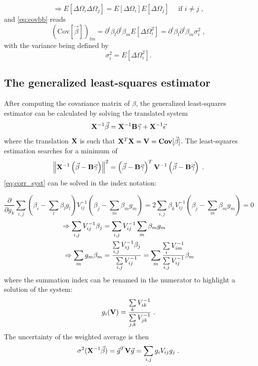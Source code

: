 %
%
\begin{equation}
\Rightarrow E\left[\Delta\Omega_i\Delta\Omega_j\right] = E\left[\Delta\Omega_i\right]E\left[\Delta\Omega_j\right]\quad \text{ if } i \neq j\;,
\end{equation}
%
and \eqref{eq:covbb} reads
%
\begin{equation}
(\text{Cov}[\vec{\beta}])_{lm} = \partial^i\beta_l\partial^i\beta_mE[\Delta\Omega_i^2] = \partial^i\beta_l\partial^i\beta_m \sigma_i^2\;,
\end{equation}
%
with the variance being defined by
%
\begin{equation}
\sigma_i^2 = E\left[\Delta\Omega_i^2\right].
\end{equation}
%
\subsection{The generalized least-squares estimator}

After computing the covariance matrix of $ \beta $, the generalized least-squares estimator can be calculated
by solving the translated system
%
\begin{equation}
\mathbf{X}^{-1} \vec{\beta} = \mathbf{X}^{-1}\mathbf{B}\vec{\gamma} + \mathbf{X}^{-1}\vec{\epsilon}
\end{equation}
%
where the translation $ \mathbf{X} $ is such that $ \mathbf{X}^T\mathbf{X} = \mathbf{V} = \mathbf{Cov}[\vec{\beta}] $. The least-squares estimation searches for a minimum of 
%
\begin{equation}
\left\|\mathbf{X}^{-1}\left(\vec{\beta} - \mathbf{B}\vec{\gamma}\right)\right\|^2 = \left(\vec{\beta} - \mathbf{B}\vec{\gamma}\right)^T \mathbf{V}^{-1}\left(\vec{\beta} - \mathbf{B}\vec{\gamma}\right)\;.
\label{eq:corr_syst}
\end{equation}
%
\eqref{eq:corr_syst} can be solved in the index notation:

\[\frac{\partial}{\partial g_k}\sum\limits_{i,j} \left(\beta_i - \sum_l\beta_lg_l\right) V_{ij}^{-1} \left(\beta_j-\sum_m\beta_mg_m\right) = 2\sum_{i,j}\beta_kV_{ij}^{-1}\left(\beta_j - \sum_m\beta_mg_m\right) = 0\]
%
\begin{align}
\Rightarrow \sum_{i,j}V_{ij}^{-1}\beta_j&=\sum_{i,j}V_{ij}^{-1}\sum_m\beta_mg_m\notag \\
\Rightarrow\sum_mg_m\beta_m &= \frac{\sum\limits_{i,j}V_{ij}^{-1}\beta_j}{\sum\limits_{i,j}V_{ij}^{-1}}=\sum_m \frac{\sum\limits_i V_{im}^{-1}}{\sum\limits_{i,j}V_{ij}^{-1}}\beta_m
\end{align}
%
 where the summation index can be renamed in the numerator to highlight a solution of the system:
%
\begin{equation}
g_i(\mathbf{V}) = \frac{\sum\limits_k V_{ik}^{-1}}{\sum\limits_{j,k}V_{jk}^{-1}}\; .
\end{equation}
%
The uncertainty of the weighted average is then
%
\begin{equation}
\sigma^2(\mathbf{X}^{-1}\vec{\beta}) = \vec{g}^T\mathbf{V}\vec{g} = \sum\limits_{i,j}g_iV_{ij}g_j\;.
\end{equation}
%
